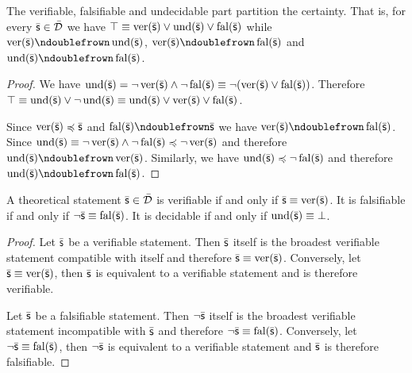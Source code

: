 \begin{mathSection}
		
		
		\begin{coro}
			The verifiable, falsifiable and undecidable part partition the certainty. That is, for every $\bar{\mathsf{s}} \in \bar{\mathcal{D}}$ we have $\top \equiv \operatorname{ver}(\bar{\mathsf{s}}) \vee \operatorname{und}(\bar{\mathsf{s}}) \vee \operatorname{fal}(\bar{\mathsf{s}})$ while $\ver(\bar{\stmt}) \ncomp \und(\bar{\stmt})$, $\ver(\bar{\stmt}) \ncomp \fal(\bar{\stmt})$ and $\und(\bar{\stmt}) \ncomp \fal(\bar{\stmt})$.
		\end{coro}
		
		\begin{proof}
			We have $\operatorname{und}(\bar{\mathsf{s}}) = \neg \operatorname{ver}(\bar{\mathsf{s}}) \wedge \neg \operatorname{fal}(\bar{\mathsf{s}}) \equiv \neg (\operatorname{ver}(\bar{\mathsf{s}}) \vee \operatorname{fal}(\bar{\mathsf{s}}))$. Therefore $\top \equiv \operatorname{und}(\bar{\mathsf{s}}) \vee \neg \operatorname{und}(\bar{\mathsf{s}}) \equiv \operatorname{und}(\bar{\mathsf{s}}) \vee \operatorname{ver}(\bar{\mathsf{s}}) \vee \operatorname{fal}(\bar{\mathsf{s}})$.
			
			Since $\operatorname{ver}(\bar{\mathsf{s}}) \preccurlyeq \bar{\mathsf{s}}$ and $\fal(\bar{\stmt}) \ncomp \bar{\stmt}$ we have $\ver(\bar{\stmt}) \ncomp \fal(\bar{\stmt})$. Since $\operatorname{und}(\bar{\mathsf{s}}) \equiv \neg \operatorname{ver}(\bar{\mathsf{s}}) \wedge \neg \operatorname{fal}(\bar{\mathsf{s}}) \preccurlyeq \neg \operatorname{ver}(\bar{\mathsf{s}})$ and therefore $\und(\bar{\stmt}) \ncomp \ver(\bar{\stmt})$. Similarly, we have $\operatorname{und}(\bar{\mathsf{s}}) \preccurlyeq \neg \operatorname{fal}(\bar{\mathsf{s}})$ and therefore $\und(\bar{\stmt}) \ncomp \fal(\bar{\stmt})$.
		\end{proof}
		
		\begin{coro}
			A theoretical statement $\bar{\mathsf{s}} \in \bar{\mathcal{D}}$ is verifiable if and only if $\bar{\mathsf{s}} \equiv \operatorname{ver}(\bar{\mathsf{s}})$. It is falsifiable if and only if $\neg\bar{\mathsf{s}} \equiv \operatorname{fal}(\bar{\mathsf{s}})$. It is decidable if and only if $\operatorname{und}(\bar{\mathsf{s}}) \equiv \bot$.
		\end{coro}
		\begin{proof}
			Let $\bar{\mathsf{s}}$ be a verifiable statement. Then $\bar{\mathsf{s}}$ itself is the broadest verifiable statement compatible with itself and therefore $\bar{\mathsf{s}} \equiv \operatorname{ver}(\bar{\mathsf{s}})$. Conversely, let $\bar{\mathsf{s}} \equiv \operatorname{ver}(\bar{\mathsf{s}})$, then $\bar{\mathsf{s}}$ is equivalent to a verifiable statement and is therefore verifiable.
			
			Let $\bar{\mathsf{s}}$ be a falsifiable statement. Then $\neg\bar{\mathsf{s}}$ itself is the broadest verifiable statement incompatible with $\bar{\mathsf{s}}$ and therefore $\neg\bar{\mathsf{s}} \equiv \operatorname{fal}(\bar{\mathsf{s}})$. Conversely, let $\neg\bar{\mathsf{s}} \equiv \operatorname{fal}(\bar{\mathsf{s}})$, then $\neg\bar{\mathsf{s}}$ is equivalent to a verifiable statement and $\bar{\mathsf{s}}$ is therefore falsifiable.
			

\end{proof}
\end{mathSection}
